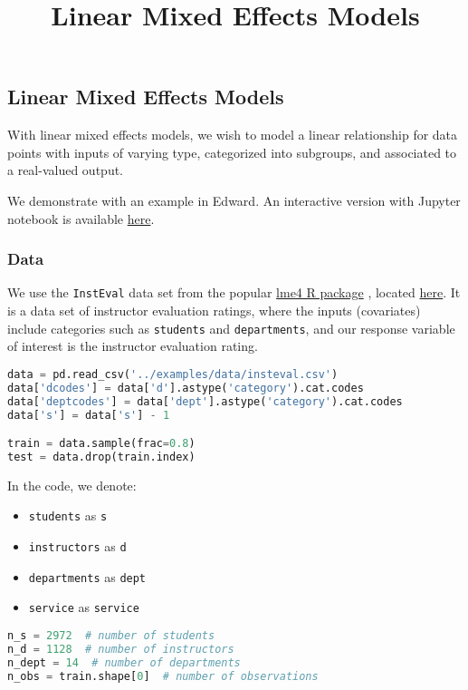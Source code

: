 \title{Linear Mixed Effects Models}

\subsection{Linear Mixed Effects Models}

With linear mixed effects models, we wish to model a linear
relationship for data points with inputs of varying type, categorized
into subgroups, and associated to a real-valued output.

We demonstrate with an example in Edward.
An interactive version with Jupyter notebook is available
\href{http://nbviewer.jupyter.org/github/blei-lab/edward/blob/master/notebooks/linear_mixed_effects_models.ipynb}{here}.

\subsubsection{Data}

We use the \texttt{InstEval} data set from the popular
\href{http://lme4.r-forge.r-project.org}{lme4 R package}
\citep{bates2015fitting}, located
\href{https://github.com/blei-lab/edward/blob/master/examples/data/insteval.csv}{here}.
It is a data set of instructor evaluation ratings, where the inputs
(covariates) include categories such as \texttt{students} and
\texttt{departments}, and our response variable of interest is the
instructor evaluation rating.

\begin{lstlisting}[language=Python]
data = pd.read_csv('../examples/data/insteval.csv')
data['dcodes'] = data['d'].astype('category').cat.codes
data['deptcodes'] = data['dept'].astype('category').cat.codes
data['s'] = data['s'] - 1

train = data.sample(frac=0.8)
test = data.drop(train.index)
\end{lstlisting}

In the code, we denote:
\begin{itemize}
\item \texttt{students} as \texttt{s}
\item \texttt{instructors} as \texttt{d}
\item \texttt{departments} as \texttt{dept}
\item \texttt{service} as \texttt{service}
\end{itemize}

\begin{lstlisting}[language=Python]
n_s = 2972  # number of students
n_d = 1128  # number of instructors
n_dept = 14  # number of departments
n_obs = train.shape[0]  # number of observations
\end{lstlisting}

